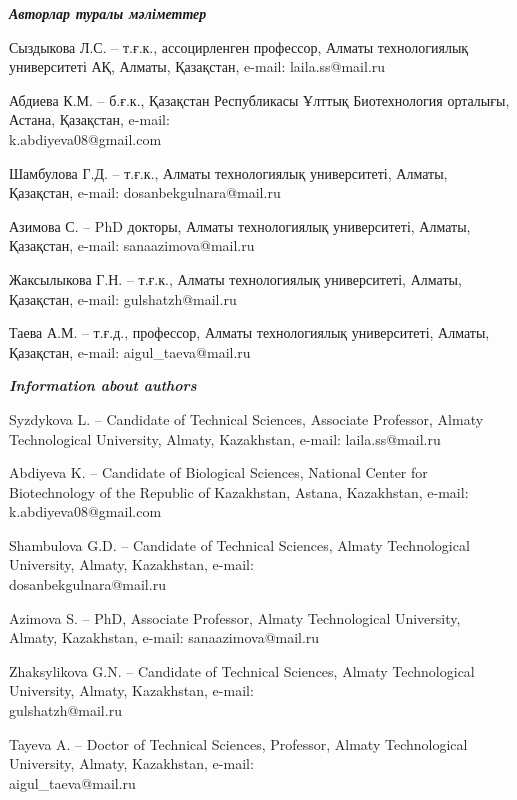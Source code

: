 \begin{authorinfo}
\emph{{\bfseries Авторлар туралы мәліметтер}}  

Сыздыкова Л.С. – т.ғ.к., ассоцирленген профессор, Алматы технологиялық
университеті АҚ, Алматы, Қазақстан, e-mail: laila.ss@mail.ru

Абдиева К.М. – б.ғ.к., Қазақстан Республикасы Ұлттық Биотехнология
орталығы, Астана, Қазақстан, e-mail: \\k.abdiyeva08@gmail.com

Шамбулова Г.Д. – т.ғ.к., Алматы технологиялық университеті, Алматы,
Қазақстан, e-mail: dosanbekgulnara@mail.ru

Азимова С. – PhD докторы, Алматы технологиялық университеті, Алматы,
Қазақстан, e-mail: sanaazimova@mail.ru

Жаксылыкова Г.Н. – т.ғ.к., Алматы технологиялық университеті, Алматы,
Қазақстан, e-mail: gulshatzh@mail.ru

Таева А.М. – т.ғ.д., профессор, Алматы технологиялық университеті,
Алматы, Қазақстан, e-mail: aigul\_taeva@mail.ru

\emph{{\bfseries Information about authors}}  

Syzdykova L. – Candidate of Technical Sciences, Associate Professor,
Almaty Technological University, Almaty, Kazakhstan, e-mail:
laila.ss@mail.ru

Abdiyeva K. – Candidate of Biological Sciences, National Center for
Biotechnology of the Republic of Kazakhstan, Astana, Kazakhstan,
e-mail: k.abdiyeva08@gmail.com

Shambulova G.D. – Candidate of Technical Sciences, Almaty
Technological University, Almaty, Kazakhstan, e-mail:\\
dosanbekgulnara@mail.ru

Azimova S. – PhD, Associate Professor, Almaty Technological
University, Almaty, Kazakhstan, e-mail: sanaazimova@mail.ru

Zhaksylikova G.N. – Candidate of Technical Sciences, Almaty
Technological University, Almaty, Kazakhstan, e-mail:\\
gulshatzh@mail.ru

Tayeva A. – Doctor of Technical Sciences, Professor, Almaty
Technological University, Almaty, Kazakhstan, e-mail:\\
aigul\_taeva@mail.ru
\end{authorinfo}
